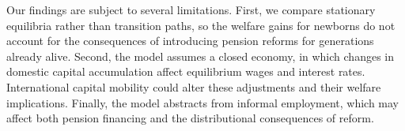 \documentclass[12pt,a4paper]{article}
\begin{document}
Our findings are subject to several limitations. First, we compare stationary equilibria rather than transition paths, so the welfare gains for newborns do not account for the consequences of introducing pension reforms for generations already alive. Second, the model assumes a closed economy, in which changes in domestic capital accumulation affect equilibrium wages and interest rates. International capital mobility could alter these adjustments and their welfare implications. Finally, the model abstracts from informal employment, which may affect both pension financing and the distributional consequences of reform.




\end{document}
